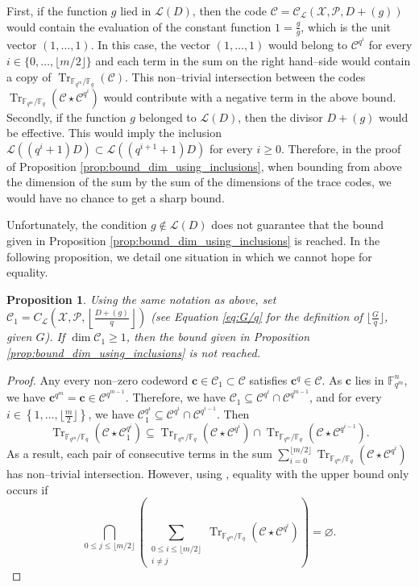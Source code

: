 \documentclass[a4paper]{article}
\newtheorem{proposition}[thm]{Proposition}
\theoremstyle{definition}
\theoremstyle{remark}
\newcommand{\calP}{\mathcal{P}}
\newcommand{\calL}{\mathcal{L}}
\newcommand{\calC}{\mathcal{C}}
\newcommand{\calX}{\mathcal{X}}
\newcommand{\fqm}{\mathbb{F}_{q^m}}
\newcommand{\fq}{\mathbb{F}_{q}}
\newcommand{\Tr}[1]{\operatorname{Tr}_{\mathbb{F}_{q^m}/\fq}\left(#1\right)}
\newcommand{\set}[1]{\left\{#1\right\}}
\begin{document}
First, if the function $g$ lied in $\calL(D)$, then the code $\calC= \calC_{\calL}(\calX,\calP,D+(g))$ would contain the evaluation of the constant function $1=\frac{g}{g}$, which is the unit vector $(1,\dots,1)$. In this case, the vector $(1,\dots,1)$ would belong to $\calC^{q^i}$ for every $i \in \{0,\dots, \lfloor{m/2} \rfloor\}$ and each term in the sum on the right hand--side would contain a copy of $\Tr{\calC}$. This non--trivial intersection between the codes $\Tr{\calC\star \calC^{q^i}}$ would contribute with a negative term in the above bound.
Secondly, if the function $g$ belonged to $\calL(D)$, then the divisor $D+(g)$ would be effective. This would imply the inclusion $\calL((q^i+1)D) \subset \calL((q^{i+1}+1)D)$ for every $i \geq 0$. Therefore, in the proof of Proposition \ref{prop:bound_dim_using_inclusions}, when bounding from above the dimension of the sum by the sum of the dimensions of the trace codes, we would have no chance to get a sharp bound.

Unfortunately, the condition $g \notin \calL(D)$ does not guarantee that the bound given in Proposition \ref{prop:bound_dim_using_inclusions} is reached. In the following proposition, we detail one situation in which we cannot hope for equality.

\begin{proposition}\label{prop:non-eq}
	Using the same notation as above, set $\calC_1=C_{\calL}\left(\calX,\mathcal{P},\left\lfloor \frac{D+(g)}{q} \right\rfloor\right)$ (see Equation \eqref{eq:G/q} for the definition of $\lfloor \frac{G}{q} \rfloor$, given $G$). If $\dim \calC_1 \geq 1$, then the bound given in Proposition \ref{prop:bound_dim_using_inclusions} is not reached.
\end{proposition}

\begin{proof}
Any every non--zero codeword $\mathbf{c} \in  \calC_1 \subset \calC$ satisfies $\mathbf{c}^q \in \calC$. As $\mathbf{c}$ lies in $\fqm^n$, we have $\mathbf{c}^{q^m}=\mathbf{c} \in \calC^{q^{m-1}}$. Therefore,  we have $\calC_1 \subseteq \calC^{q^i} \cap \calC^{q^{m-1}}$, and for every $i \in \set{1,\dots,\lfloor \frac{m}{2}\rfloor}$, we have $\calC_1^{q^i} \subseteq \calC^{q^i} \cap \calC^{q^{i-1}}$. Then
\[\Tr{\calC\star\calC_1^{q^i}} \subseteq \Tr{\calC\star\calC^{q^i}} \cap \Tr{\calC\star\calC^{q^{i-1}}}.\]
As a result, each pair of consecutive terms in the sum $\sum\limits_{i=0}^{\lfloor m/2 \rfloor} \Tr{\calC \star \calC^{q^i}}$ has non--trivial intersection. However, using \cite[Theorem~2]{T19}, equality with the upper bound only occurs if
\[\bigcap_{0\leq j \leq \lfloor m/2\rfloor} \left( \sum_{\substack{0\leq i \leq \lfloor m/2 \rfloor\\ i\neq j}} \Tr{\calC \star \calC^{q^i}} \right)= \varnothing.\]
\end{proof}
\end{document}

